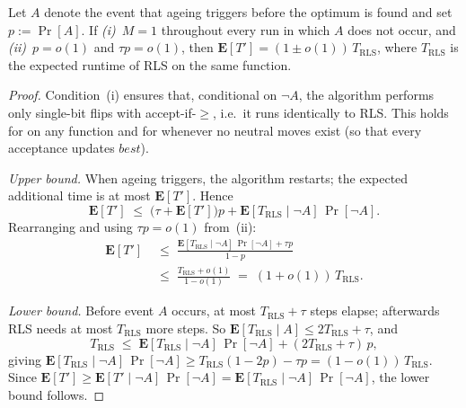 \begin{lemma}\label{lem:RLS-reduction}
Let $A$ denote the event that ageing triggers before the optimum is found
and set $p:=\Pr[A]$.
If \emph{(i)}~$M=1$ throughout every run in which $A$ does not occur, and
\emph{(ii)}~$p=o(1)$ and $\tau p=o(1)$,
then $\mathbf{E}[T']=(1\pm o(1))\,T_{\mathrm{RLS}}$,
where $T_{\mathrm{RLS}}$ is the expected runtime of RLS
 on the same function.
\end{lemma}

\begin{proof}
Condition~(i) ensures that, conditional on $\lnot A$, the algorithm performs
only single-bit flips with accept-if-$\geq$, i.e.\ it runs identically to RLS.
This holds for \lastBest{} on any function and for \firstBest{} whenever
no neutral moves exist (so that every acceptance updates $\mathit{best}$).

\textit{Upper bound.}
When ageing triggers, the algorithm restarts; the expected additional time is
at most $\mathbf{E}[T']$.  Hence
\[
  \mathbf{E}[T'] \;\leq\;
    \bigl(\tau + \mathbf{E}[T']\bigr)p
    + \mathbf{E}[T_{\mathrm{RLS}}\mid\lnot A]\,\Pr[\lnot A].
\]
Rearranging and using $\tau p=o(1)$ from~(ii):
\begin{align*}
  \mathbf{E}[T'] &\;\leq\;
  \frac{\mathbf{E}[T_{\mathrm{RLS}}\mid\lnot A]\,\Pr[\lnot A]+\tau p}{1-p}\\
 & \;\leq\;
  \frac{T_{\mathrm{RLS}}+o(1)}{1-o(1)}
  \;=\; (1+o(1))\,T_{\mathrm{RLS}}.
\end{align*}

\textit{Lower bound.}
Before event $A$ occurs, at most $T_{\mathrm{RLS}}+\tau$ steps elapse;
afterwards RLS needs at most $T_{\mathrm{RLS}}$ more steps.  So
$\mathbf{E}[T_{\mathrm{RLS}}\mid A]\leq 2T_{\mathrm{RLS}}+\tau$, and
\[
  T_{\mathrm{RLS}} \;\leq\;
    \mathbf{E}[T_{\mathrm{RLS}}\mid\lnot A]\,\Pr[\lnot A]
    + (2T_{\mathrm{RLS}}+\tau)\,p,
\]
giving $\mathbf{E}[T_{\mathrm{RLS}}\mid\lnot A]\,\Pr[\lnot A]
\geq T_{\mathrm{RLS}}(1-2p)-\tau p=(1-o(1))\,T_{\mathrm{RLS}}$.
Since $\mathbf{E}[T']\geq\mathbf{E}[T'\mid\lnot A]\,\Pr[\lnot A]
=\mathbf{E}[T_{\mathrm{RLS}}\mid\lnot A]\,\Pr[\lnot A]$, the lower bound
follows.
\end{proof}

